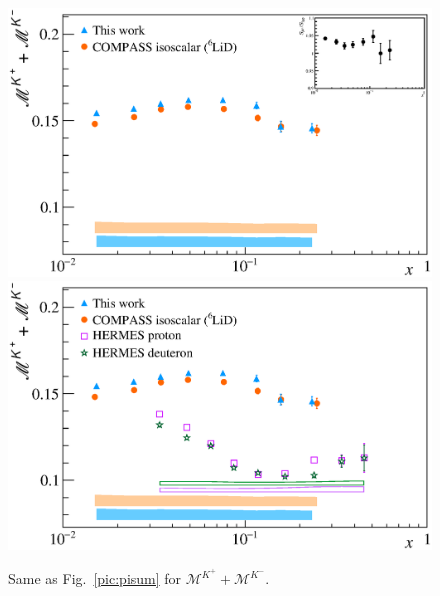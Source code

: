 \begin{figure}[!h]
  \centering
	\includegraphics[scale=0.5]{./gfx/Mult_k_sum_noH.eps}
  \includegraphics[scale=0.5]{./gfx/Mult_k_sum.eps}
  \caption{Same as Fig.~\ref{pic:pisum} for $\mathscr{M}^{K^+}+\mathscr{M}^{K^-}$.}
  \label{pic:ksum}
\end{figure}

